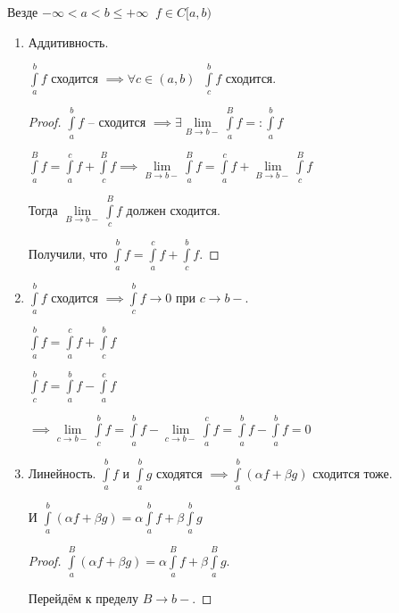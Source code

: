 
\begin{properties}\slashns
	
	Везде $-\infty < a < b \le + \infty \;\; f \in C[a,b)$
	
	\begin{enumerate}
		\item
		Аддитивность.
		
		$\int\limits_a^b f$ сходится $\implies \forall c \in (a,b) \;\; \int\limits_c^b f$ сходится.
		
		\begin{proof}\slashns
			
			$\int\limits_a^b f$ -- сходится $\implies \exists \lim\limits_{B \to b -} \int\limits_a^B f =: \int\limits_a^b f$
			
			$\int\limits_a^B f= \int\limits_a^c f + \int\limits_c^B f \implies \lim\limits_{B \to b-} \int\limits_a^B f = \int\limits_a^c f + \lim\limits_{B \to b-} \int\limits_c^B f $
			
			Тогда $\lim\limits_{B \to b-} \int\limits_c^B f$ должен сходится. 
			
			Получили, что $\int\limits_a^b f = \int\limits_a^c f + \int\limits_c^b f$.	
		\end{proof}
		
		\item
		$\int\limits_a^b f$  сходится $\implies \int\limits_c^b f \to 0$ при $c \to b-$.
		
		$\int\limits_a^b f = \int\limits_a^c f + \int\limits_c^b f$
		
		$\int\limits_c^b f = \int\limits_a^b f - \int\limits_a^c f$
		
		$\implies \lim\limits_{c \to b-} \int\limits_c^b f = \int\limits_a^b f - \lim\limits_{c \to b-} \int\limits_a^c f = \int\limits_a^b f - \int\limits_a^b f = 0$
		
		\item
		Линейность. $\int\limits_a^b f$ и $\int\limits_a^b g$ сходятся $\implies \int\limits_a^b(\alpha f + \beta g)$ сходится тоже.
		
		И $\int\limits_a^b(\alpha f + \beta g) = \alpha \int\limits_a^b f +\beta \int\limits_a^b g$
		
		\begin{proof}\slashns
			
			
			$\int\limits_a^B(\alpha f + \beta g) = \alpha \int\limits_a^B f + \beta \int\limits_a^B g$.
			
			Перейдём к пределу $B \to b-$.
			

\end{proof}
\end{enumerate}
\end{properties}

